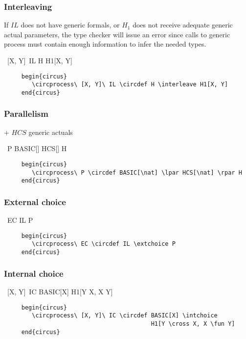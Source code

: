 \documentclass{article}
\begin{document}
\subsubsection{Interleaving}

If $IL$ does not have generic formals, or $H_1$ does not receive adequate generic actual parameters,
the type checker will issue an error since calls to generic process must contain enough information
to infer the needed types.
%
\begin{circus}
    \circprocess\ [X, Y]\ IL \circdef H \interleave H1[X, Y]
\end{circus}
%
\begin{verbatim}
     begin{circus}
        \circprocess\ [X, Y]\ IL \circdef H \interleave H1[X, Y]
     end{circus}
\end{verbatim}

\subsubsection{Parallelism}

+ $HCS$ generic actuals
\begin{circus}
    \circprocess\ P \circdef BASIC[\nat] \lpar HCS[\nat] \rpar H
\end{circus}
%
\begin{verbatim}
     begin{circus}
        \circprocess\ P \circdef BASIC[\nat] \lpar HCS[\nat] \rpar H
     end{circus}
\end{verbatim}

\subsubsection{External choice}

\begin{circus}
    \circprocess\ EC \circdef IL \extchoice P
\end{circus}
%
\begin{verbatim}
     begin{circus}
        \circprocess\ EC \circdef IL \extchoice P
     end{circus}
\end{verbatim}


\subsubsection{Internal choice}

\begin{circus}
    \circprocess\ [X, Y]\ IC \circdef BASIC[X] \intchoice H1[Y \cross X, X \fun Y]
\end{circus}
%
\begin{verbatim}
     begin{circus}
        \circprocess\ [X, Y]\ IC \circdef BASIC[X] \intchoice
                                          H1[Y \cross X, X \fun Y]
     end{circus}
\end{verbatim}
\end{document}
